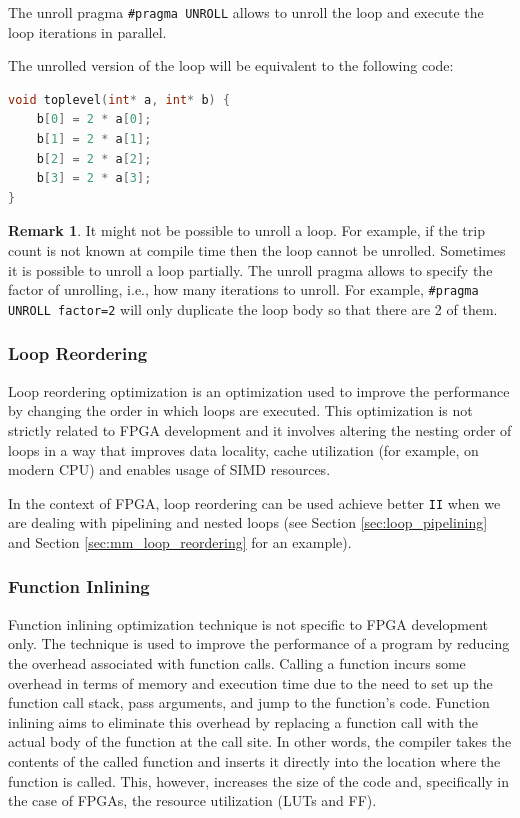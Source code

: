 \documentclass[a4paper, twoside]{report}
\theoremstyle{definition}
\newtheorem{remark}[theorem]{Remark}
\numberwithin{equation}{section}
\begin{document}
The unroll pragma \texttt{\#pragma UNROLL} allows to unroll the loop and execute
the loop iterations in parallel.

The unrolled version of the loop will be equivalent to the following code:
\begin{lstlisting}[language=c++,numbers=none]
void toplevel(int* a, int* b) {
	b[0] = 2 * a[0];
	b[1] = 2 * a[1];
	b[2] = 2 * a[2];
	b[3] = 2 * a[3];
}
\end{lstlisting}

\begin{remark}
    It might not be possible to unroll a loop.
    For example, if the trip count is not known at compile time then the loop cannot be unrolled.
    Sometimes it is possible to unroll a loop partially. The unroll pragma allows to specify
    the factor of unrolling, i.e., how many iterations to unroll.
    For example, \texttt{\#pragma UNROLL factor=2} will only duplicate the loop body
    so that there are 2 of them.
\end{remark}

\subsubsection{Loop Reordering}

Loop reordering optimization is an optimization used to improve the performance
by changing the order in which loops are executed.
This optimization is not strictly related to FPGA development and
it involves altering the nesting order of loops in a way that improves data locality,
cache utilization (for example, on modern CPU) and enables usage of SIMD resources.

In the context of FPGA, loop reordering can be used achieve better \texttt{II}
when we are dealing with pipelining and nested loops (see Section \ref{sec:loop_pipelining} and Section \ref{sec:mm_loop_reordering} for an example).

\subsubsection{Function Inlining}

Function inlining optimization technique is not specific to FPGA development only.
The technique is used to improve the performance of a program by reducing the overhead associated with function calls.
Calling a function incurs some overhead in terms of memory and execution time due to the need to set up the function call stack, pass arguments, and jump to the function's code.
Function inlining aims to eliminate this overhead by replacing a function call with the actual body of the function at the call site.
In other words, the compiler takes the contents of the called function and inserts it directly into the location where the function is called.
This, however, increases the size of the code and, specifically in the case of FPGAs, the resource utilization (LUTs and FF).
\end{document}
